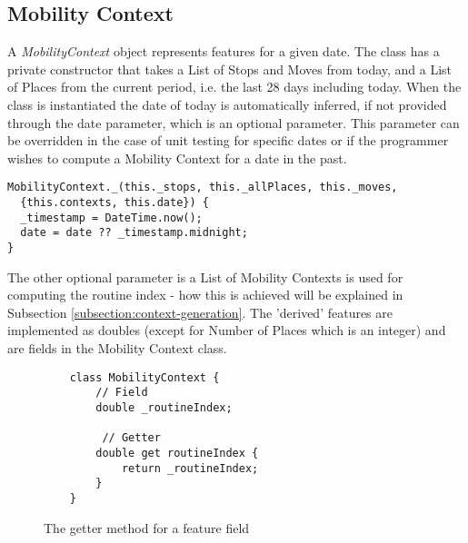 \subsection{Mobility Context}
A \textit{MobilityContext} object represents features for a given date. The class has a private constructor that takes a List of Stops and Moves from today, and a List of Places from the current period, i.e. the last 28 days including today. When the class is instantiated the date of today is automatically inferred, if not provided through the date parameter, which is an optional parameter. This parameter can be overridden in the case of unit testing for specific dates or if the programmer wishes to compute a Mobility Context for a date in the past.

\begin{verbatim}
MobilityContext._(this._stops, this._allPlaces, this._moves,
  {this.contexts, this.date}) {
  _timestamp = DateTime.now();
  date = date ?? _timestamp.midnight;
}
\end{verbatim}

The other optional parameter is a List of Mobility Contexts is used for computing the routine index - how this is achieved will be explained in Subsection \ref{subsection:context-generation}. The 'derived' features are implemented as doubles (except for Number of Places which is an integer) and are fields in the Mobility Context class.

\begin{figure}
    \centering
    \begin{verbatim}
    class MobilityContext {
        // Field
        double _routineIndex;
     
         // Getter
        double get routineIndex {
            return _routineIndex;
        }
    }
    \end{verbatim}
    \caption{The getter method for a feature field}
    \label{fig:feature-getter}
\end{figure}


